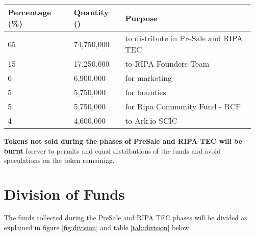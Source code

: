 \documentclass[11pt,fleqn]{book} %
\begin{document}
\vspace{5mm}
	\label{fig:distribution}

\vspace{5mm}
\begin{table}[H]
	\centering
	\begin{tabular}{l l l}
		\toprule
		\textbf{Percentage (\%)} & \textbf{Quantity (\PHP)} & \textbf{Purpose} \\
		\midrule
		65		& 74,750,000	& to distribute in PreSale and RIPA TEC	\\
		15      & 17,250,000	& to RIPA Founders Team	\\
		6       & 6,900,000		& for marketing	\\
		5       & 5,750,000 	& for bounties	\\
		5       & 5,750,000		& for Ripa Community Fund - RCF	\\
		4       & 4,600,000		& to Ark.io SCIC \\
		\bottomrule
	\end{tabular}
	\label{tab:distribution}
\end{table}

\vspace{5mm}
\textbf{Tokens not sold during the phases of PreSale and RIPA TEC will be burnt} forever to permits and equal distributions 
of the funds and avoid speculations on the token remaining.

\section{Division of Funds}
The funds collected during the PreSale and RIPA TEC phases will be divided as explained in figure \ref{fig:division} and 
table \ref{tab:division} below

\vspace{5mm}
\label{fig:division}
\end{document}
